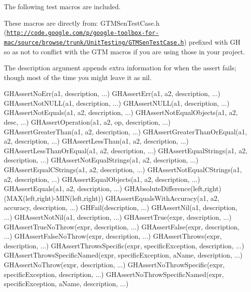 \-The following test macros are included.

\-These macros are directly from\-: \-G\-T\-M\-Sen\-Test\-Case.\-h (\href{http://code.google.com/p/google-toolbox-for-mac/source/browse/trunk/UnitTesting/GTMSenTestCase.h}{\tt http\-://code.\-google.\-com/p/google-\/toolbox-\/for-\/mac/source/browse/trunk/\-Unit\-Testing/\-G\-T\-M\-Sen\-Test\-Case.\-h}) prefixed with \-G\-H so as not to conflict with the \-G\-T\-M macros if you are using those in your project.

\-The {\ttfamily description} argument appends extra information for when the assert fails; though most of the time you might leave it as nil.


\begin{DoxyCode}
 GHAssertNoErr(a1, description, ...)
 GHAssertErr(a1, a2, description, ...)
 GHAssertNotNULL(a1, description, ...)
 GHAssertNULL(a1, description, ...)
 GHAssertNotEquals(a1, a2, description, ...)
 GHAssertNotEqualObjects(a1, a2, desc, ...)
 GHAssertOperation(a1, a2, op, description, ...)
 GHAssertGreaterThan(a1, a2, description, ...)
 GHAssertGreaterThanOrEqual(a1, a2, description, ...)
 GHAssertLessThan(a1, a2, description, ...)
 GHAssertLessThanOrEqual(a1, a2, description, ...)
 GHAssertEqualStrings(a1, a2, description, ...)
 GHAssertNotEqualStrings(a1, a2, description, ...)
 GHAssertEqualCStrings(a1, a2, description, ...)
 GHAssertNotEqualCStrings(a1, a2, description, ...)
 GHAssertEqualObjects(a1, a2, description, ...)
 GHAssertEquals(a1, a2, description, ...)
 GHAbsoluteDifference(left,right) (MAX(left,right)-MIN(left,right))
 GHAssertEqualsWithAccuracy(a1, a2, accuracy, description, ...)
 GHFail(description, ...)
 GHAssertNil(a1, description, ...)
 GHAssertNotNil(a1, description, ...)
 GHAssertTrue(expr, description, ...)
 GHAssertTrueNoThrow(expr, description, ...)
 GHAssertFalse(expr, description, ...)
 GHAssertFalseNoThrow(expr, description, ...)
 GHAssertThrows(expr, description, ...)
 GHAssertThrowsSpecific(expr, specificException, description, ...)
 GHAssertThrowsSpecificNamed(expr, specificException, aName, description, ...)
 GHAssertNoThrow(expr, description, ...)
 GHAssertNoThrowSpecific(expr, specificException, description, ...)
 GHAssertNoThrowSpecificNamed(expr, specificException, aName, description, ...)
\end{DoxyCode}
 